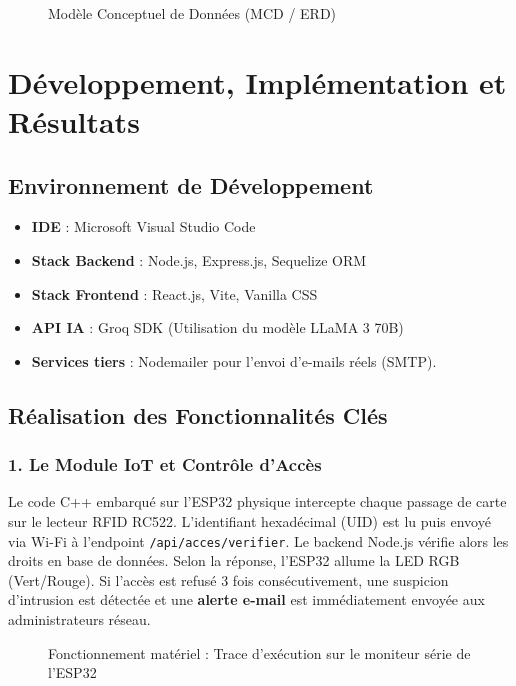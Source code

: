 \documentclass[12pt,a4paper]{report}
\begin{document}
\begin{figure}[h]
    \centering
    \caption{Modèle Conceptuel de Données (MCD / ERD)}
\end{figure}

\chapter{Développement, Implémentation et Résultats}

\section{Environnement de Développement}
\begin{itemize}
    \item \textbf{IDE} : Microsoft Visual Studio Code
    \item \textbf{Stack Backend} : Node.js, Express.js, Sequelize ORM
    \item \textbf{Stack Frontend} : React.js, Vite, Vanilla CSS
    \item \textbf{API IA} : Groq SDK (Utilisation du modèle LLaMA 3 70B)
    \item \textbf{Services tiers} : Nodemailer pour l'envoi d'e-mails réels (SMTP).
\end{itemize}

\section{Réalisation des Fonctionnalités Clés}

\subsection{1. Le Module IoT et Contrôle d'Accès}
Le code C++ embarqué sur l'ESP32 physique intercepte chaque passage de carte sur le lecteur RFID RC522. L'identifiant hexadécimal (UID) est lu puis envoyé via Wi-Fi à l'endpoint \texttt{/api/acces/verifier}. Le backend Node.js vérifie alors les droits en base de données. Selon la réponse, l'ESP32 allume la LED RGB (Vert/Rouge). Si l'accès est refusé 3 fois consécutivement, une suspicion d'intrusion est détectée et une \textbf{alerte e-mail} est immédiatement envoyée aux administrateurs réseau.

\begin{figure}[h]
    \centering
    \caption{Fonctionnement matériel : Trace d'exécution sur le moniteur série de l'ESP32}
\end{figure}
\end{document}
